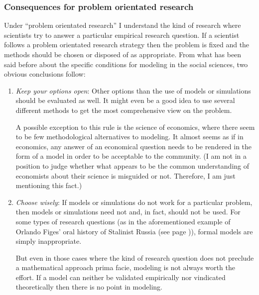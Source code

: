 \documentclass[onecollarge]{STJour}
\numberwithin{equation}{section}
\begin{document}
\subsubsection{Consequences for problem orientated research}

Under ``problem orientated research'' I understand the kind of research
where scientists try to answer a particular empirical research question.
If a scientist follows a problem orientated research strategy then the
problem is fixed and the methods should be chosen or disposed of as
appropriate. From what has been said before about the specific conditions
for modeling in the social sciences, two obvious conclusions follow:

\begin{enumerate}

  \item {\em Keep your options open}:  Other options than the use of
  models or simulations should be evaluated as well. It might even be a
  good idea to use several different methods to get the most
  comprehensive view on the problem.
 
  A possible exception to this rule is the science of economics, where
  there seem to be few methodological alternatives to modeling. It
  almost seems as if in economics, any answer of an economical question
  needs to be rendered in the form of a model in order to be acceptable to
  the community. (I am not in a position to judge whether what appears to be
  the common understanding of economists about their science is misguided
  or not. Therefore, I am just mentioning this fact.)
  
  \item {\em Choose wisely}: If models or simulations do not work for a
  particular problem, then models or simulations need not and, in fact,
  should not be used. For some types of research questions (as in the
  aforementioned example of Orlando Figes' oral history of Stalinist
  Russia (see page \pageref{figes})), formal models are simply
  inappropriate.
  
  But even in those cases where the kind of research question does not
  preclude a mathematical approach prima facie, modeling is not always
  worth the effort. If a model can neither be validated empirically nor
  vindicated theoretically then there is no point in modeling.
\end{enumerate}
\end{document}

